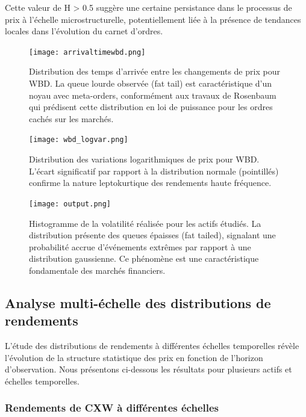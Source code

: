 \documentclass[12pt,a4paper]{article}
\theoremstyle{definition}
\theoremstyle{remark}
\begin{document}
Cette valeur de H > 0.5 suggère une certaine persistance dans le processus de prix à l'échelle microstructurelle, potentiellement liée à la présence de tendances locales dans l'évolution du carnet d'ordres.

\begin{figure}[h!]
    \centering
    \texttt{[image: arrivaltimewbd.png]}
    \caption{Distribution des temps d'arrivée entre les changements de prix pour WBD. La queue lourde observée (fat tail) est caractéristique d'un noyau avec meta-orders, conformément aux travaux de Rosenbaum qui prédisent cette distribution en loi de puissance pour les ordres cachés sur les marchés.}
    \label{fig:arrival_times_wbd}
\end{figure}

\begin{figure}[h!]
    \centering
    \texttt{[image: wbd\_logvar.png]}
    \caption{Distribution des variations logarithmiques de prix pour WBD. L'écart significatif par rapport à la distribution normale (pointillés) confirme la nature leptokurtique des rendements haute fréquence.}
    \label{fig:log_variations_wbd}
\end{figure}

\begin{figure}[h!]
    \centering
    \texttt{[image: output.png]}
    \caption{Histogramme de la volatilité réalisée pour les actifs étudiés. La distribution présente des queues épaisses (fat tailed), signalant une probabilité accrue d'événements extrêmes par rapport à une distribution gaussienne. Ce phénomène est une caractéristique fondamentale des marchés financiers.}
    \label{fig:volatility_hist}
\end{figure}

\subsection{Analyse multi-échelle des distributions de rendements}

L'étude des distributions de rendements à différentes échelles temporelles révèle l'évolution de la structure statistique des prix en fonction de l'horizon d'observation. Nous présentons ci-dessous les résultats pour plusieurs actifs et échelles temporelles.

\subsubsection{Rendements de CXW à différentes échelles}
\end{document}
